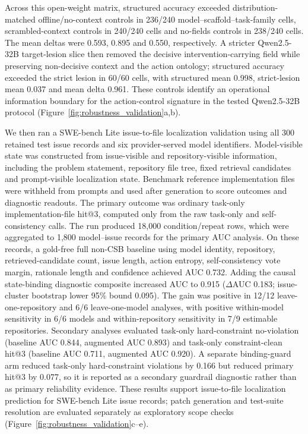﻿\documentclass[preprint,12pt,authoryear]{elsarticle}
\begin{document}
Across this open-weight matrix, structured accuracy exceeded distribution-matched offline/no-context controls in 236/240 model--scaffold--task-family cells, scrambled-context controls in 240/240 cells and no-fields controls in 238/240 cells. The mean deltas were 0.593, 0.895 and 0.550, respectively. A stricter Qwen2.5-32B target-lesion slice then removed the decisive intervention-carrying field while preserving non-decisive context and the action ontology; structured accuracy exceeded the strict lesion in 60/60 cells, with structured mean 0.998, strict-lesion mean 0.037 and mean delta 0.961. These controls identify an operational information boundary for the action-control signature in the tested Qwen2.5-32B protocol (Figure~\ref{fig:robustness_validation}a,b).

We then ran a SWE-bench Lite issue-to-file localization validation using all 300 retained test issue records and six provider-served model identifiers. Model-visible state was constructed from issue-visible and repository-visible information, including the problem statement, repository file tree, fixed retrieval candidates and prompt-visible localization state. Benchmark reference implementation files were withheld from prompts and used after generation to score outcomes and diagnostic readouts. The primary outcome was ordinary task-only implementation-file hit@3, computed only from the raw task-only and self-consistency calls. The run produced 18,000 condition/repeat rows, which were aggregated to 1,800 model--issue records for the primary AUC analysis. On these records, a gold-free full non-CSB baseline using model identity, repository, retrieved-candidate count, issue length, action entropy, self-consistency vote margin, rationale length and confidence achieved AUC 0.732. Adding the causal state-binding diagnostic composite increased AUC to 0.915 (\(\Delta\)AUC 0.183; issue-cluster bootstrap lower 95\% bound 0.095). The gain was positive in 12/12 leave-one-repository and 6/6 leave-one-model analyses, with positive within-model sensitivity in 6/6 models and within-repository sensitivity in 7/9 estimable repositories. Secondary analyses evaluated task-only hard-constraint no-violation (baseline AUC 0.844, augmented AUC 0.893) and task-only constraint-clean hit@3 (baseline AUC 0.711, augmented AUC 0.920). A separate binding-guard arm reduced task-only hard-constraint violations by 0.166 but reduced primary hit@3 by 0.077, so it is reported as a secondary guardrail diagnostic rather than as primary reliability evidence. These results support issue-to-file localization prediction for SWE-bench Lite issue records; patch generation and test-suite resolution are evaluated separately as exploratory scope checks (Figure~\ref{fig:robustness_validation}c--e).
\end{document}
